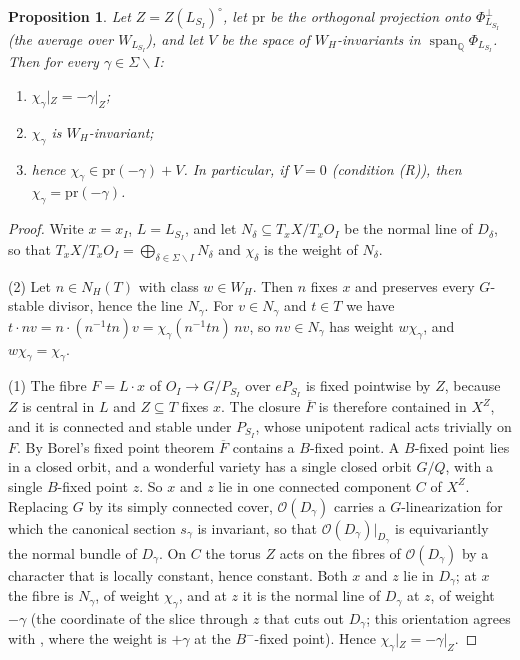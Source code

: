 \documentclass[11pt]{amsart}
\newtheorem{proposition}[theorem]{Proposition}
\theoremstyle{definition}
\theoremstyle{remark}
\newcommand{\QQ}{\mathbb{Q}}
\newcommand{\pr}{\mathrm{pr}}
\begin{document}
\begin{proposition}\label{prop:normal}
Let $Z = Z(L_{S_I})^\circ$, let $\pr$ be the orthogonal projection onto
$\Phi_{L_{S_I}}^{\perp}$ (the average over $W_{L_{S_I}}$), and let $V$ be the
space of $W_H$-invariants in $\operatorname{span}_\QQ\Phi_{L_{S_I}}$. Then
for every $\gamma\in\Sigma\smallsetminus I$:
\begin{enumerate}
\item $\chi_\gamma|_Z = -\gamma|_Z$;
\item $\chi_\gamma$ is $W_H$-invariant;
\item hence $\chi_\gamma\in\pr(-\gamma)+V$. In particular, if $V=0$
(condition \textup{(R)}), then $\chi_\gamma = \pr(-\gamma)$.
\end{enumerate}
\end{proposition}
\begin{proof}
Write $x=x_I$, $L=L_{S_I}$, and let $N_\delta\subseteq T_xX/T_xO_I$ be the
normal line of $D_\delta$, so that $T_xX/T_xO_I=\bigoplus_{\delta\in
\Sigma\smallsetminus I}N_\delta$ and $\chi_\delta$ is the weight of $N_\delta$.

(2) Let $n\in N_H(T)$ with class $w\in W_H$. Then $n$ fixes $x$ and
preserves every $G$-stable divisor, hence the line $N_\gamma$. For $v\in
N_\gamma$ and $t\in T$ we have $t\cdot nv = n\cdot(n^{-1}tn)v =
\chi_\gamma(n^{-1}tn)\,nv$, so $nv\in N_\gamma$ has weight $w\chi_\gamma$, and
$w\chi_\gamma=\chi_\gamma$.

(1) The fibre $F = L\cdot x$ of $O_I\to G/P_{S_I}$ over $eP_{S_I}$ is fixed
pointwise by $Z$, because $Z$ is central in $L$ and $Z\subseteq T$ fixes
$x$. The closure $\overline F$ is therefore contained in $X^Z$, and it is
connected and stable under $P_{S_I}$, whose unipotent radical acts
trivially on $F$. By Borel's fixed point theorem $\overline F$ contains a
$B$-fixed point. A $B$-fixed point lies in a closed orbit, and a wonderful
variety has a single closed orbit $G/Q$, with a single $B$-fixed point $z$.
So $x$ and $z$ lie in one connected component $C$ of $X^Z$. Replacing $G$
by its simply connected cover, $\mathcal O(D_\gamma)$ carries a
$G$-linearization for which the canonical section $s_\gamma$ is invariant,
so that $\mathcal O(D_\gamma)|_{D_\gamma}$ is equivariantly the normal bundle
of $D_\gamma$. On $C$ the torus $Z$ acts on the fibres of $\mathcal
O(D_\gamma)$ by a character that is locally constant, hence constant. Both
$x$ and $z$ lie in $D_\gamma$; at $x$ the fibre is $N_\gamma$, of weight
$\chi_\gamma$, and at $z$ it is the normal line of $D_\gamma$ at $z$, of
weight $-\gamma$ (the coordinate of the slice through $z$ that cuts out
$D_\gamma$; this orientation agrees with \cite[\S1.3]{BrionJoshua}, where the
weight is $+\gamma$ at the $B^-$-fixed point). Hence $\chi_\gamma|_Z =
-\gamma|_Z$.


\end{proof}
\end{document}
